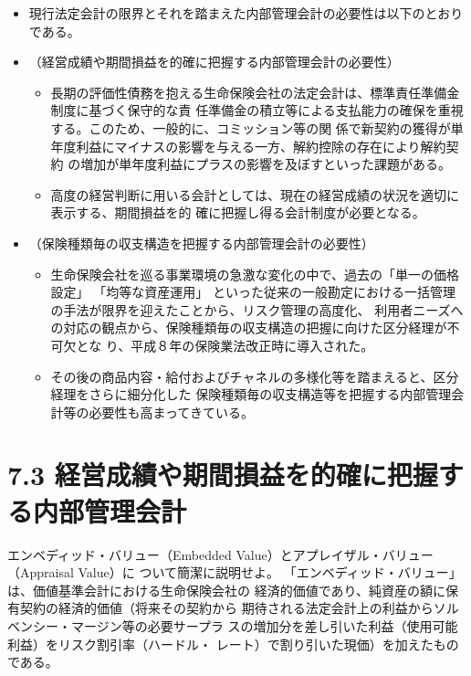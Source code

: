 \documentclass[report,gutter=10mm,fore-edge=10mm,uplatex,dvipdfmx]{jlreq}
\begin{document}
\begin{itemize}
 \item[] 現行法定会計の限界とそれを踏まえた内部管理会計の必要性は以下のとおりである。\\
\item[] （経営成績や期間損益を的確に把握する内部管理会計の必要性）
\begin{itemize}
  \item[] 長期の評価性債務を抱える生命保険会社の法定会計は、標準責任準備金制度に基づく保守的な責
 任準備金の積立等による支払能力の確保を重視する。このため、一般的に、コミッション等の関
 係で新契約の獲得が単年度利益にマイナスの影響を与える一方、解約控除の存在により解約契約
 の増加が単年度利益にプラスの影響を及ぼすといった課題がある。
 \item[] 高度の経営判断に用いる会計としては、現在の経営成績の状況を適切に表示する、期間損益を的
 確に把握し得る会計制度が必要となる。\\
\end{itemize} 
\item[]（保険種類毎の収支構造を把握する内部管理会計の必要性）
\begin{itemize}
  \item[] 生命保険会社を巡る事業環境の急激な変化の中で、過去の「単一の価格設定」
 「均等な資産運用」
 といった従来の一般勘定における一括管理の手法が限界を迎えたことから、リスク管理の高度化、
 利用者ニーズへの対応の観点から、保険種類毎の収支構造の把握に向けた区分経理が不可欠とな
 り、平成８年の保険業法改正時に導入された。
 \item[] その後の商品内容・給付およびチャネルの多様化等を踏まえると、区分経理をさらに細分化した
 保険種類毎の収支構造等を把握する内部管理会計等の必要性も高まってきている。
\end{itemize}
\end{itemize}
\section{7.3 経営成績や期間損益を的確に把握する内部管理会計}

エンベディッド・バリュー（Embedded Value）とアプレイザル・バリュー（Appraisal Value）に
ついて簡潔に説明せよ。
\answer{}
「エンベディッド・バリュー」は、価値基準会計における生命保険会社の
経済的価値であり、純資産の額に保有契約の経済的価値（将来その契約から
期待される法定会計上の利益からソルベンシー・マージン等の必要サープラ
スの増加分を差し引いた利益（使用可能利益）をリスク割引率（ハードル・
レート）で割り引いた現価）を加えたものである。
\end{document}
